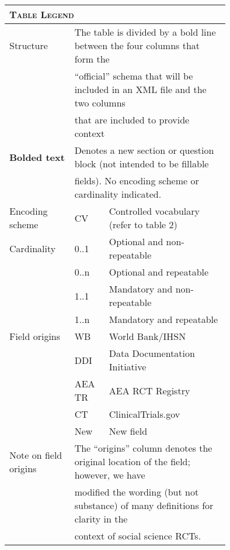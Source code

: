  \scriptsize
  \begin{tabular}{p{0.2\linewidth}p{0.10\linewidth}p{0.45\linewidth}}
    \multicolumn{3}{l}{\textbf{\textsc{Table Legend}}} \\
    \hline\hline
    Structure & \multicolumn{2}{l}{The table is divided by a bold line between the four columns that form the} \\
    & \multicolumn{2}{l}{``official'' schema that will be included in an XML file and the two columns} \\
    & \multicolumn{2}{l}{that are included to provide context}  \\
    \textbf{Bolded text} & \multicolumn{2}{l}{Denotes a new section or question block (not intended to be fillable} \\
                         & \multicolumn{2}{l}{fields). No encoding scheme or cardinality indicated.} \\
    Encoding scheme      & CV   & Controlled vocabulary (refer to table 2) \\
    Cardinality          & 0..1 & Optional and non-repeatable \\
                         & 0..n & Optional and repeatable \\
                         & 1..1 & Mandatory and non-repeatable \\
                         & 1..n & Mandatory and repeatable \\
    Field origins        & WB & World Bank/IHSN \\
                         & DDI & Data Documentation Initiative \\
                         & AEA TR & AEA RCT Registry \\
                         & CT & ClinicalTrials.gov \\
                         & New & New field \\
    Note on field origins & \multicolumn{2}{l}{The ``origins'' column denotes the original location of the field; however, we have} \\ & \multicolumn{2}{l}{modified the wording (but not substance) of many definitions for clarity in the} \\ & \multicolumn{2}{l}{context of social science RCTs.} \\
    \hline\hline
     \end{tabular}

